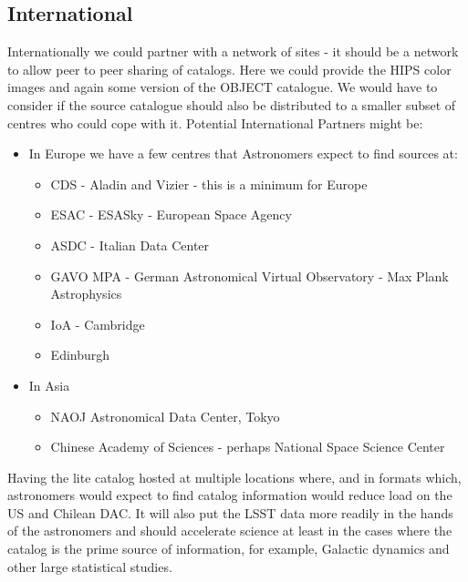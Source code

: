 \subsection {International}
Internationally we could partner with a network of sites - it should be a network to allow peer to peer sharing of catalogs. Here we could provide the HIPS color images and again some version of the OBJECT catalogue. We would have to consider if the source catalogue should also be distributed to a smaller subset of centres who could cope with it.
Potential International Partners might be:

\begin{itemize}
\item In Europe we have a few centres that Astronomers expect to find sources at:
\begin{itemize}
    \item CDS  - Aladin and Vizier - this is a minimum for Europe
    \item ESAC - ESASky - European Space Agency
    \item  ASDC - Italian Data Center
    \item  GAVO MPA - German Astronomical Virtual Observatory - Max Plank Astrophysics
    \item  IoA - Cambridge
    \item  Edinburgh
\end{itemize}
\item In Asia
\begin{itemize}
    \item  NAOJ Astronomical Data Center, Tokyo
    \item  Chinese Academy of Sciences - perhaps National Space Science Center
\end{itemize}
\end{itemize}

Having the lite catalog hosted at multiple locations where, and in formats which, astronomers would expect to find catalog information would reduce load on the US and Chilean DAC. It will also put the LSST data more readily in the hands of the astronomers and should accelerate science at least in the cases where the catalog is the prime source of information, for example, Galactic dynamics and other large statistical studies.
